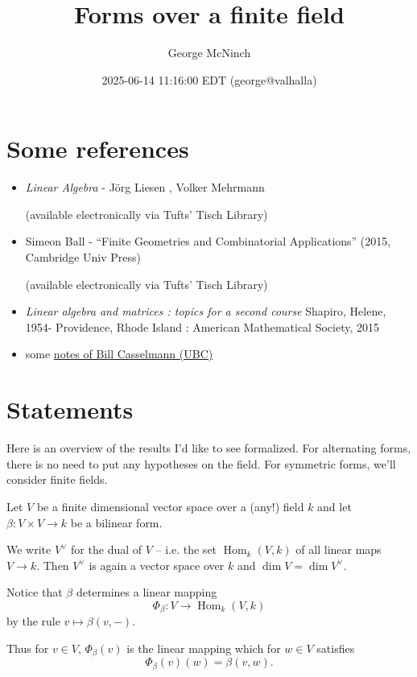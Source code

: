 \documentclass[11pt]{article}
\author{George McNinch}
\date{2025-06-14 11:16:00 EDT (george@valhalla)}
\title{Forms over a finite field}
\numberwithin{equation}{section}
\newcommand{\Hom}{\operatorname{Hom}}
\begin{document}
\maketitle
\section{Some references}
\label{sec:orgd1eb726}

\begin{itemize}
\item \emph{Linear Algebra} - Jörg Liesen , Volker Mehrmann  

(available electronically via Tufts' Tisch Library)

\item Simeon Ball - ``Finite Geometries and Combinatorial Applications'' (2015, Cambridge Univ Press)

(available electronically via Tufts' Tisch Library)

\item \emph{Linear algebra and matrices : topics for a second course}
Shapiro, Helene, 1954-
Providence, Rhode Island : American Mathematical Society, 2015

\item some \href{https://personal.math.ubc.ca/\~cass/siegel/FiniteFields.pdf}{notes of Bill Casselmann (UBC)}
\end{itemize}
\section{Statements}
\label{sec:org5f343fc}

Here is an overview of the results I'd like to see formalized. For
alternating forms, there is no need to put any hypotheses on the
field. For symmetric forms, we'll consider finite fields.


Let \(V\) be a finite dimensional vector space over a (any!) field
\(k\) and let \(\beta:V \times V \to k\) be a bilinear form.

We write \(V^\vee\) for the dual of \(V\) -- i.e. the set
\(\Hom_k(V,k)\) of all linear maps \(V \to k\).  Then \(V^\vee\) is
again a vector space over \(k\) and \(\dim V = \dim V^\vee.\)

Notice that \(\beta\) determines a linear mapping
\[\Phi_\beta:V \to \Hom_k(V,k)\] by the rule
\(v \mapsto \beta(v,-).\)

Thus for \(v \in V\), \(\Phi_\beta(v)\) is the linear mapping which for \(w\in V\) satisfies
\[\Phi_\beta(v)(w) = \beta(v,w).\]
\end{document}
